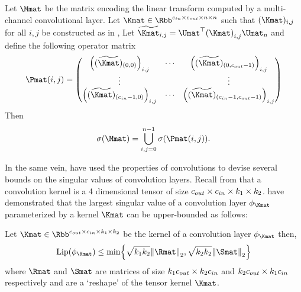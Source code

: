 \begin{theorem} 
  Let $\Mmat$ be the matrix encoding the linear transform computed by a multi-channel convolutional layer.
  Let $\Kmat \in \Rbb^{\cin \times \cout \times n \times n}$ such that $(\Kmat)_{i,j}$ for all $i,j$ be constructed as in , 
  Let $\widetilde{\Kmat}_{i,j} = \Umat^\top \leftmat \Kmat \rightmat_{i,j} \Umat_n $ and define the following operator matrix 
  \begin{equation}
    \Pmat(i,j) = \leftmatrix 
    \leftmat (\widetilde{\Kmat})_{(0,0)} \rightmat_{i, j} & \cdots & \leftmat (\widetilde{\Kmat})_{(0, \cout-1)} \rightmat_{i, j} \\
    \vdots & & \vdots \\
    \leftmat (\widetilde{\Kmat})_{(\cin-1, 0)} \rightmat_{i, j} & \cdots & \leftmat (\widetilde{\Kmat})_{(\cin-1, \cout-1)} \rightmat_{i, j}
    \rightmatrix
  \end{equation}
  Then
  \begin{equation}
    \sigma(\Mmat) = \bigcup_{i, j = 0}^{n-1} \sigma \left(  \Pmat(i,j) \right).
  \end{equation}
  \removespace
\end{theorem}





In the same vein, \citet{singla2019bounding} have used the properties of convolutions to devise several bounds on the singular values of convolution layers.
Recall from  that a convolution kernel is a 4 dimensional tensor of size $c_{out} \times c_{in} \times k_1 \times k_2$.
\citet{singla2019bounding} have demonstrated that the largest singular value of a convolution layer $\layer_\Kmat$ parameterized by a kernel $\Kmat$ can be upper-bounded as follows:

\begin{theorem}
  Let $\Kmat \in \Rbb^{\cout \times \cin \times k_1 \times k_2}$ be the kernel of a convolution layer $\layer_\Kmat$ then,  
  \begin{equation}
    \lip{\layer_\Kmat} \leq \min \left\{ \sqrt{k_1 k_2} \norm{\Rmat}_2, \sqrt{k_2 k_2} \norm{\Smat}_2 \right\}
  \end{equation}
  where $\Rmat$ and $\Smat$ are matrices of size $k_1 c_{out} \times k_2 c_{in}$ and $k_2 c_{out} \times k_1 c_{in}$ respectively and are a `reshape' of the tensor kernel $\Kmat$.
\end{theorem}

